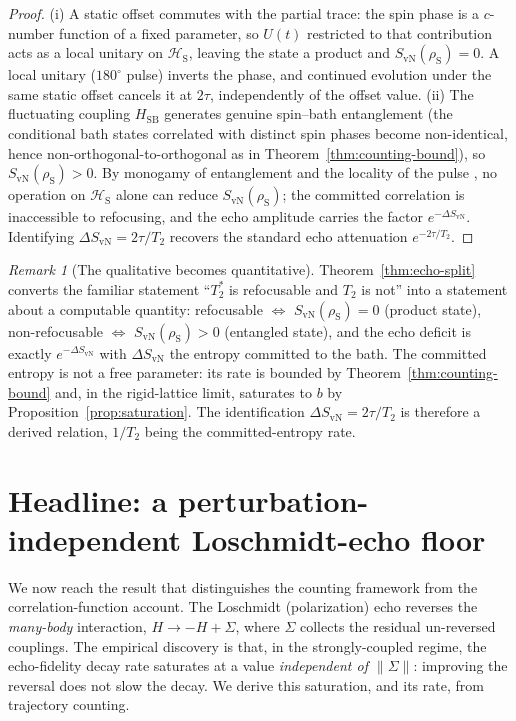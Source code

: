 \documentclass[twocolumn,10pt,a4paper]{article}
\theoremstyle{thmstyle}
\theoremstyle{definition}
\theoremstyle{remark}
\newtheorem{remark}[theorem]{Remark}
\newcommand{\Hilb}{\mathcal{H}}
\newcommand{\sysrho}{\rho_{\mathrm{S}}}
\newcommand{\Svn}{S_{\mathrm{vN}}}
\newcommand{\Ttwo}{T_{2}}
\newcommand{\Tstar}{T_{2}^{\ast}}
\begin{document}
\begin{proof}
(i) A static offset commutes with the partial trace: the spin phase is a
$c$-number function of a fixed parameter, so $U(t)$ restricted to that
contribution acts as a local unitary on $\Hilb_{\mathrm{S}}$, leaving the
state a product and $\Svn(\sysrho)=0$. A local unitary ($180^{\circ}$
pulse) inverts the phase, and continued evolution under the same static
offset cancels it at $2\tau$, independently of the offset value. (ii) The
fluctuating coupling $H_{\mathrm{SB}}$ generates genuine spin--bath
entanglement (the conditional bath states correlated with distinct spin
phases become non-identical, hence non-orthogonal-to-orthogonal as in
Theorem~\ref{thm:counting-bound}), so $\Svn(\sysrho)>0$. By monogamy of
entanglement and the locality of the pulse \citep{coffman2000}, no operation
on $\Hilb_{\mathrm{S}}$ alone can reduce $\Svn(\sysrho)$; the committed
correlation is inaccessible to refocusing, and the echo amplitude carries
the factor $e^{-\Delta\Svn}$. Identifying $\Delta\Svn=2\tau/\Ttwo$ recovers
the standard echo attenuation $e^{-2\tau/\Ttwo}$.
\end{proof}

\begin{remark}[The qualitative becomes quantitative]
\label{rem:quantitative}
Theorem~\ref{thm:echo-split} converts the familiar statement ``$\Tstar$ is
refocusable and $\Ttwo$ is not'' into a statement about a computable
quantity: refocusable $\Leftrightarrow$ $\Svn(\sysrho)=0$ (product state),
non-refocusable $\Leftrightarrow$ $\Svn(\sysrho)>0$ (entangled state), and
the echo deficit is exactly $e^{-\Delta\Svn}$ with $\Delta\Svn$ the
entropy committed to the bath. The committed entropy is not a free
parameter: its rate is bounded by Theorem~\ref{thm:counting-bound} and, in
the rigid-lattice limit, saturates to $b$ by
Proposition~\ref{prop:saturation}. The identification
$\Delta\Svn=2\tau/\Ttwo$ is therefore a derived relation, $1/\Ttwo$ being
the committed-entropy rate.
\end{remark}

\section{Headline: a perturbation-independent Loschmidt-echo floor}
\label{sec:floor}

We now reach the result that distinguishes the counting framework from the
correlation-function account. The Loschmidt (polarization) echo reverses
the \emph{many-body} interaction, $H\to-H+\Sigma$, where $\Sigma$ collects
the residual un-reversed couplings. The empirical discovery
\citep{levstein1998,pastawski2000,jalabert2001} is that, in the
strongly-coupled regime, the echo-fidelity decay rate saturates at a value
\emph{independent of $\|\Sigma\|$}: improving the reversal does not slow the
decay. We derive this saturation, and its rate, from trajectory counting.
\end{document}
